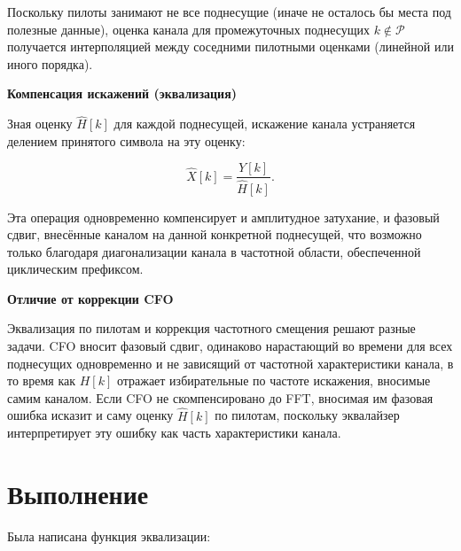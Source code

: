 Поскольку пилоты занимают не все поднесущие (иначе не осталось бы места
под полезные данные), оценка канала для промежуточных поднесущих
$k \notin \mathcal{P}$ получается интерполяцией между соседними
пилотными оценками (линейной или иного порядка).

\vspace{20pt}

\textbf{Компенсация искажений (эквализация)}\newline

Зная оценку $\hat{H}[k]$ для каждой поднесущей, искажение канала
устраняется делением принятого символа на эту оценку:

\begin{equation}
    \hat{X}[k] = \frac{Y[k]}{\hat{H}[k]}.
\end{equation}

Эта операция одновременно компенсирует и амплитудное затухание, и
фазовый сдвиг, внесённые каналом на данной конкретной поднесущей, что
возможно только благодаря диагонализации канала в частотной области,
обеспеченной циклическим префиксом.

\vspace{20pt}

\textbf{Отличие от коррекции CFO}\newline

Эквализация по пилотам и коррекция частотного смещения решают разные
задачи. CFO вносит фазовый сдвиг, одинаково нарастающий во времени для
всех поднесущих одновременно и не зависящий от частотной характеристики
канала, в то время как $H[k]$ отражает избирательные по частоте
искажения, вносимые самим каналом. Если CFO не скомпенсировано до FFT,
вносимая им фазовая ошибка исказит и саму оценку $\hat{H}[k]$ по
пилотам, поскольку эквалайзер интерпретирует эту ошибку как часть
характеристики канала.

\section*{Выполнение}

Была написана функция эквализации:

